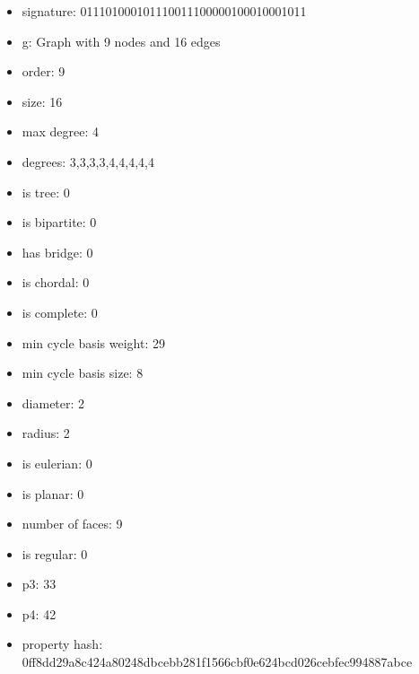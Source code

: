 \newpage
\begin{figure}
\end{figure}
\begin{itemize}
\item signature: 011101000101110011100000100010001011
\item g: Graph with 9 nodes and 16 edges
\item order: 9
\item size: 16
\item max degree: 4
\item degrees: 3,3,3,3,4,4,4,4,4
\item is tree: 0
\item is bipartite: 0
\item has bridge: 0
\item is chordal: 0
\item is complete: 0
\item min cycle basis weight: 29
\item min cycle basis size: 8
\item diameter: 2
\item radius: 2
\item is eulerian: 0
\item is planar: 0
\item number of faces: 9
\item is regular: 0
\item p3: 33
\item p4: 42
\item property hash: 0ff8dd29a8c424a80248dbcebb281f1566cbf0e624bcd026cebfec994887abce
\end{itemize}
